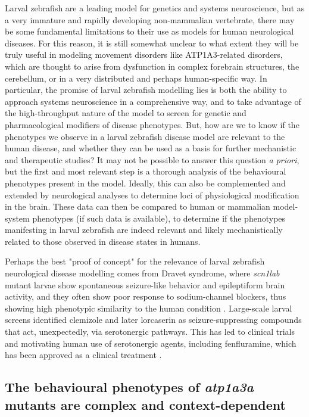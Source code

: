 \documentclass[9.5pt,lineno]{RandlettLab_elife}
\begin{document}
Larval zebrafish are a leading model for genetics and systems neuroscience, but as a very immature and rapidly developing non-mammalian vertebrate, there may be some fundamental limitations to their use as models for human neurological diseases.
For this reason, it is still somewhat unclear to what extent they will be truly useful in modeling movement disorders like ATP1A3-related disorders, which are thought to arise from dysfunction in complex forebrain structures, the cerebellum, or in a very distributed and perhaps human-specific way.
In particular, the promise of larval zebrafish modelling lies is both the ability to approach systems neuroscience in a comprehensive way, and to take advantage of the high-throughput nature of the model to screen for genetic and pharmacological modifiers of disease phenotypes.
But, how are we to know if the phenotypes we observe in a larval zebrafish disease model are relevant to the human disease, and whether they can be used as a basis for further mechanistic and therapeutic studies?
It may not be possible to answer this question \emph{a priori}, but the first and most relevant step is a thorough analysis of the behavioural phenotypes present in the model. 
Ideally, this can also be complemented and extended by neurological analyses to determine loci of physiological modification in the brain. 
These data can then be compared to human or mammalian model-system phenotypes (if such data is available), to determine if the phenotypes manifesting in larval zebrafish are indeed relevant and likely mechanistically related to those observed in disease states in humans.

Perhaps the best "proof of concept" for the relevance of larval zebrafish neurological disease modelling comes from Dravet syndrome, where \emph{scn1lab} mutant larvae show spontaneous seizure-like behavior and epileptiform brain activity, and they often show poor response to sodium-channel blockers, thus showing high phenotypic similarity to the human condition \citep{Baraban2013-NC, Dinday2015-EN}. 
Large-scale larval screens identified clemizole and later lorcaserin as seizure-suppressing compounds that act, unexpectedly, via serotonergic pathways. 
This has led to clinical trials and motivating human use of serotonergic agents, including fenfluramine, which has been approved as a clinical treatment \citep{Lagae2019-LS, Nabbout2020-JAMA}. 


\subsection{The behavioural phenotypes of \emph{atp1a3a} mutants are complex and context-dependent} 
\end{document}
